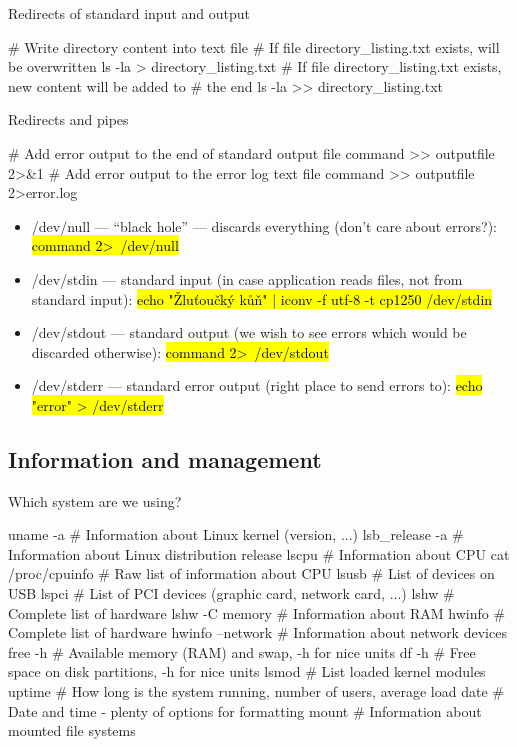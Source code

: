 \documentclass[compress, ucs, xelatex, 11pt, xcolor=svgnames,
  hyperref={
    bookmarks=true,
    unicode=true,
    colorlinks=true,
    pdftitle={Linux, command line and MetaCentrum},
    plainpages=false,
    pdfauthor={Vojtech Zeisek},
    pdfsubject={Course about use of Linux command line, writing shell scripts and using MetaCentrum of CESNET},
    pdfcreator={XeLaTeX, http://www.xelatex.org/},
    pdfkeywords={Linux, GNU, BASH, shell, command line, MetaCentrum},
    linkcolor=Sienna,
    anchorcolor=black,
    citecolor=green,
    filecolor=magenta,
    menucolor=Sienna,
    urlcolor=cyan,
    pdftex},
  url={hyphens, lowtilde} %
  ]{beamer}
\renewcommand{\texttt}[1]{\hl{\ttfamily #1}}
\begin{document}
\begin{frame}[fragile]{Redirects of standard input and output}
  \begin{bashcode}
    # Write directory content into text file
    # If file directory_listing.txt exists, will be overwritten
    ls -la > directory_listing.txt
    # If file directory_listing.txt exists, new content will be added to
    # the end
    ls -la >> directory_listing.txt
  \end{bashcode}
\end{frame}

\begin{frame}[fragile, label=pipe]{Redirects and pipes}
  \begin{bashcode}
    # Add error output to the end of standard output file
    command >> outputfile 2>&1
    # Add error output to the error log text file
    command >> outputfile 2>error.log
  \end{bashcode}
\begin{itemize}
  \item /dev/null --- ``black hole'' --- discards everything (don't care about errors?): \texttt{command 2\textgreater~/dev/null}
  \item /dev/stdin --- standard input (in case application reads files, not from standard input): \texttt{echo "Žluťoučký kůň" | iconv -f utf-8 -t cp1250 /dev/stdin}
  \item /dev/stdout --- standard output (we wish to see errors which would be discarded otherwise): \texttt{command 2\textgreater~/dev/stdout}
  \item /dev/stderr --- standard error output (right place to send errors to): \texttt{echo "error" > /dev/stderr}
\end{itemize}
\end{frame}

\subsection{Information and management}

\begin{frame}[fragile]{Which system are we using?}
  \begin{bashcode}
    uname -a # Information about Linux kernel (version, ...)
    lsb_release -a # Information about Linux distribution release
    lscpu # Information about CPU
    cat /proc/cpuinfo # Raw list of information about CPU
    lsusb # List of devices on USB
    lspci # List of PCI devices (graphic card, network card, ...)
    lshw # Complete list of hardware
    lshw -C memory # Information about RAM
    hwinfo # Complete list of hardware
    hwinfo --network # Information about network devices
    free -h # Available memory (RAM) and swap, -h for nice units
    df -h # Free space on disk partitions, -h for nice units
    lsmod # List loaded kernel modules
    uptime # How long is the system running, number of users, average load
    date # Date and time - plenty of options for formatting
    mount # Information about mounted file systems
  \end{bashcode}
\end{frame}
\end{document}
